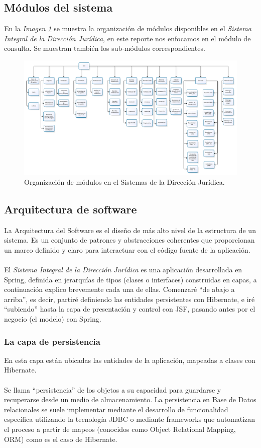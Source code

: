 \documentclass[../reportesINE.tex]{subfiles}
\begin{document}
\subsection{Módulos del sistema}
En la \textit{Imagen \ref{fig:organizacionModulos}} se muestra la organización de módulos disponibles en el \textit{Sistema Integral de la Dirección Jurídica}, en este reporte nos enfocamos en el módulo de consulta. Se muestran también los sub-módulos correspondientes. 

\begin{figure}[h]
  \centering
  \includegraphics[width=\linewidth]{img/organizacionModulos.png}
  \caption{Organización de módulos en el Sistemas de la Dirección Jurídica.}
  \label{fig:organizacionModulos}
\end{figure}
\clearpage

\subsection{Arquitectura de software}
La Arquitectura del Software es el diseño de más alto nivel de la estructura de un sistema. Es un conjunto de patrones y abstracciones coherentes que proporcionan un marco definido y claro para interactuar con el código fuente de la aplicación. \\ \\
El \textit{Sistema Integral de la Dirección Jurídica} es una aplicación desarrollada en Spring, definida en jerarquías de tipos (clases o interfaces) construidas en capas, a continuación explico brevemente cada una de ellas. 
Comenzaré “de abajo a arriba”, es decir, partiré definiendo las entidades persistentes con Hibernate, e iré “subiendo” hasta la capa de presentación y control con JSF, pasando antes por el negocio (el modelo) con Spring.

\subsubsection{La capa de persistencia}
En esta capa están ubicadas las entidades de la aplicación, mapeadas a clases con Hibernate. \\ \\
Se llama “persistencia” de los objetos a su capacidad para guardarse y recuperarse desde un medio de almacenamiento. La persistencia en Base de Datos relacionales se suele implementar mediante el desarrollo de funcionalidad específica utilizando la tecnología JDBC o mediante frameworks que automatizan el proceso a partir de mapeos (conocidos como Object Relational Mapping, ORM) como es el caso de Hibernate.
\end{document}
